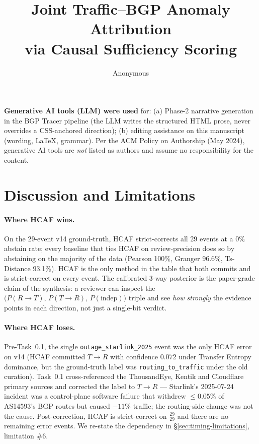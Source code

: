 \documentclass[sigconf,review,nonatbib]{acmart}
\title{Joint Traffic--BGP Anomaly Attribution\\via Causal Sufficiency Scoring}
\author{Anonymous}
\affiliation{%
  \institution{Anonymous Institution}
  \city{Anonymous}
  \state{XX}
  \country{Anon}
}
\begin{document}
\maketitle

\begin{teaser}
\textbf{Generative AI tools (LLM) were used} for: (a) Phase-2
narrative generation in the BGP Tracer pipeline (the LLM writes
the structured HTML prose, never overrides a CSS-anchored
direction); (b) editing assistance on this manuscript (wording,
LaTeX, grammar). Per the ACM Policy on Authorship (May 2024),
generative AI tools are \emph{not} listed as authors and assume no
responsibility for the content.
\end{teaser}








\section{Discussion and Limitations}
\label{sec:discussion}

\paragraph{Where HCAF wins.} On the 29-event v14 ground-truth, HCAF
strict-corrects all 29 events at a 0\% abstain rate; every
baseline that ties HCAF on review-precision does so by abstaining
on the majority of the data (Pearson 100\%, Granger 96.6\%,
Ts-Distance 93.1\%). HCAF is the only method in the table that
both commits and is strict-correct on every event. The
calibrated 3-way posterior is the paper-grade claim of the
synthesis: a reviewer can inspect the
$\big(P(R\!\to\!T),\,P(T\!\to\!R),\,P(\text{indep})\big)$ triple
and see \emph{how strongly} the evidence points in each
direction, not just a single-bit verdict.

\paragraph{Where HCAF loses.} Pre-Task~0.1, the single
\texttt{outage\_starlink\_2025} event was the only HCAF error on
v14 (HCAF committed $T\!\to\!R$ with confidence $0.072$ under
Transfer Entropy dominance, but the ground-truth label was
\texttt{routing\_to\_traffic} under the old curation). Task~0.1
cross-referenced the ThousandEye, Kentik and Cloudflare primary
sources and corrected the label to $T\!\to\!R$ --- Starlink's
2025-07-24 incident was a control-plane software failure that
withdrew $\le 0.05\%$ of AS14593's BGP routes but caused
$-11\%$ traffic; the routing-side change was not the cause.
Post-correction, HCAF is strict-correct on $\frac{29}{29}$ and
there are no remaining error events. We re-state the dependency
in \S\ref{sec:timing-limitations}, limitation \#6.
\end{document}
